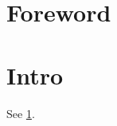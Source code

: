\documentclass{wrapper}
\begin{document}
\wrapperclass\articleclass\layoutmode\hypermode
\tableofcontents
\section*{Foreword}
{}
\section{Intro}\label{sec:intro}
See \ref{sec:intro}.
\end{document}
